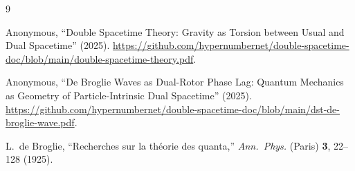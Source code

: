\documentclass[a4paper]{article}
\begin{document}
\begin{thebibliography}{9}
\raggedright

Anonymous,
``Double Spacetime Theory: Gravity as Torsion between Usual and Dual Spacetime'' (2025).
\url{https://github.com/hypernumbernet/double-spacetime-doc/blob/main/double-spacetime-theory.pdf}.

Anonymous,
``De Broglie Waves as Dual-Rotor Phase Lag: Quantum Mechanics as Geometry of Particle-Intrinsic Dual Spacetime'' (2025).
\url{https://github.com/hypernumbernet/double-spacetime-doc/blob/main/dst-de-broglie-wave.pdf}.

L.~de Broglie,
``Recherches sur la th\'eorie des quanta,''
\textit{Ann.\ Phys.} (Paris) \textbf{3}, 22--128 (1925).

\end{thebibliography}
\end{document}
